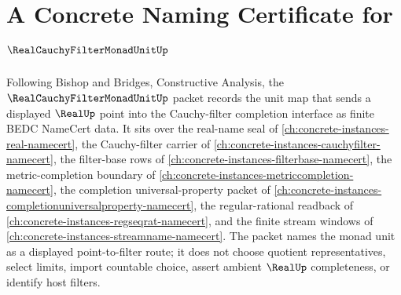 \chapter{A Concrete Naming Certificate for $\RealCauchyFilterMonadUnitUp$}
\label{ch:concrete-instances-real-cauchy-filter-monad-unit-namecert}

Following Bishop and Bridges, Constructive Analysis, the $\RealCauchyFilterMonadUnitUp$ packet records the unit map that sends a displayed $\RealUp$ point into the Cauchy-filter completion interface as finite BEDC NameCert data. It sits over the real-name seal of \autoref{ch:concrete-instances-real-namecert}, the Cauchy-filter carrier of \autoref{ch:concrete-instances-cauchyfilter-namecert}, the filter-base rows of \autoref{ch:concrete-instances-filterbase-namecert}, the metric-completion boundary of \autoref{ch:concrete-instances-metriccompletion-namecert}, the completion universal-property packet of \autoref{ch:concrete-instances-completionuniversalproperty-namecert}, the regular-rational readback of \autoref{ch:concrete-instances-regseqrat-namecert}, and the finite stream windows of \autoref{ch:concrete-instances-streamname-namecert}. The packet names the monad unit as a displayed point-to-filter route; it does not choose quotient representatives, select limits, import countable choice, assert ambient $\RealUp$ completeness, or identify host filters.

